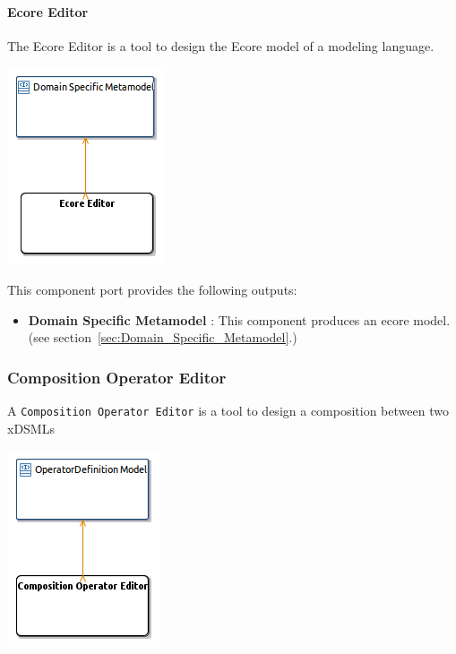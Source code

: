 \documentclass{gemoc} %
\begin{document}
\paragraph{Ecore Editor}
\label{sec:Ecore_Editor}

The Ecore Editor is a tool to design the Ecore model of a modeling language.
\begin{center}
\includegraphics*[trim=0.0cm 0.0cm 0cm 0.0cm, clip=true]{../images/generated/Generated_Ecore_Editor.png}
\end{center}


This component port provides the following outputs:
\begin{itemize}
  \item \textbf{Domain Specific Metamodel} :
This component produces an ecore model.
(see section~\ref{sec:Domain_Specific_Metamodel}.)
\end{itemize}



\subsubsection{Composition Operator Editor}
\label{sec:Composition_Operator_Editor}
A \texttt{Composition Operator Editor} is a tool to design a composition between two xDSMLs
\begin{center}
\includegraphics*[trim=0.0cm 0.0cm 0cm 0.0cm, clip=true]{../images/generated/Generated_Composition_Operator_Editor.png}
\end{center}
\end{document}
